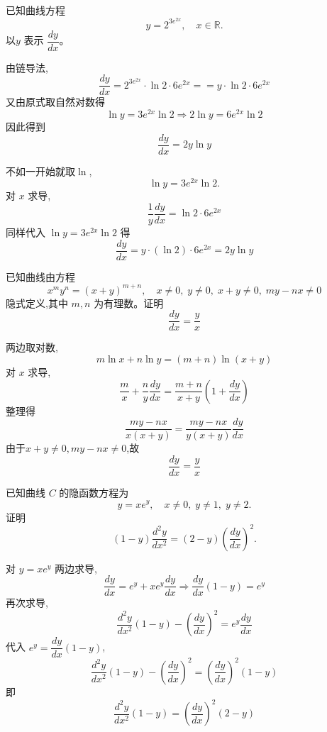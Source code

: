 \begin{questions}
    \question 已知曲线方程
    \[
    y = 2^{3e^{2x}}, \quad x \in \mathbb{R}.
    \]
    以$y$ 表示 $\dfrac{dy}{dx}$。
    \begin{solution}
        由链导法,
        \[
        \frac{dy}{dx} = 2^{3e^{2x}} \cdot \ln 2 \cdot 6 e^{2x} = = y \cdot \ln 2 \cdot 6 e^{2x}
        \]
        又由原式取自然对数得
        \[
        \ln y = 3 e^{2x} \ln 2 \Rightarrow 2 \ln y = 6 e^{2x} \ln 2
        \]
        因此得到
        \[
        \frac{dy}{dx} = 2y \ln y
        \]
    \end{solution}
    \begin{solution}
        不如一开始就取$\ln$,
        \[
        \ln y = 3 e^{2x} \ln 2.
        \]
        对 $x$ 求导,
        \[
        \frac{1}{y}\frac{dy}{dx} = \ln 2 \cdot 6 e^{2x} 
        \]
        同样代入 $\ln y = 3 e^{2x} \ln 2$ 得
        \[
        \frac{dy}{dx} = y \cdot (\ln 2) \cdot 6 e^{2x} = 2 y \ln y
        \]
    \end{solution}

    \question 已知曲线由方程
    \[
    x^m y^n = (x+y)^{m+n}, \quad x\neq 0,\; y\neq 0,\; x+y\neq 0,\; my-nx\neq 0
    \]
    隐式定义,其中 $m,n$ 为有理数。证明
    \[
    \frac{dy}{dx} = \frac{y}{x}
    \]
    \begin{solution}
        两边取对数,
        \[
        m\ln x + n\ln y = (m+n)\ln(x+y)
        \]
        对 $x$ 求导,
        \[
        \frac{m}{x} + \frac{n}{y} \frac{dy}{dx} = \frac{m+n}{x+y}\left(1+\frac{dy}{dx}\right)
        \]
        整理得
        \[
        \frac{my-nx}{x(x+y)} = \frac{my-nx}{y(x+y)} \frac{dy}{dx}
        \]
        由于$x+y\neq 0, my-nx\neq 0$,故
        \[
        \frac{dy}{dx} = \frac{y}{x}
        \]
    \end{solution}

    \question 已知曲线 $C$ 的隐函数方程为
    \[
    y = xe^y, \quad x \neq 0, \; y \neq 1, \; y \neq 2.
    \]
    证明
    \[
    (1-y)\frac{d^2 y}{dx^2} = (2-y)\left(\frac{dy}{dx}\right)^2.
    \]
    \begin{solution}
        对 $y = xe^y$ 两边求导,
        \[
        \frac{dy}{dx} = e^y + x e^y \frac{dy}{dx} \Rightarrow \frac{dy}{dx}(1 - y) = e^y 
        \]
        再次求导,
        \[
        \frac{d^2 y}{dx^2}(1-y) - \left(\frac{dy}{dx}\right)^2 = e^y \frac{dy}{dx}
        \]
        代入 $e^y = \dfrac{dy}{dx}(1-y)$,
        \[
        \frac{d^2 y}{dx^2}(1-y) - \left(\frac{dy}{dx}\right)^2 = \left(\frac{dy}{dx}\right)^2 (1-y)
        \]
        即 
        \[
        \frac{d^2 y}{dx^2}(1-y) = \left(\frac{dy}{dx}\right)^2 (2-y)
        \]
    \end{solution}


\end{questions}
